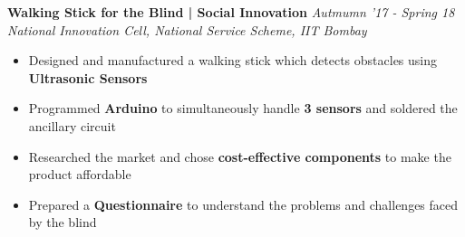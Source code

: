 \documentclass[11pt]{article}%
\begin{document}
{\flushleft \bf \large{Walking Stick for the Blind | Social Innovation}} \hfill {{{\em{Autmumn '17 - Spring 18}}}} \\
{\em{National Innovation Cell, National Service Scheme, IIT Bombay}}
\vspace{-2mm}
\begin{itemize}
\setlength\itemsep{0.01em}
\item Designed and manufactured a walking stick which detects obstacles using {\bf Ultrasonic Sensors}
\vspace{-1.2mm}
\item Programmed {\bf Arduino} to simultaneously handle {\bf 3 sensors} and soldered the ancillary circuit
\vspace{-1.2mm}
\item Researched the market and chose {\bf cost-effective components} to make the product affordable
\vspace{-1.2mm}
\item Prepared a {\bf Questionnaire} to understand the problems and challenges faced by the blind
\end{itemize}
\vspace{-0.5cm}
\end{document}
